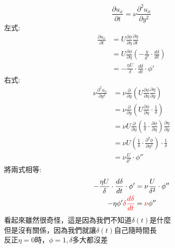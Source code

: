 \documentclass[../main.tex]{subfiles}
\begin{document}
\begin{itemize}
\begin{enumerate}
\begin{itemize}
\begin{enumerate}
        \begin{equation}
          \frac{\partial u_x}{\partial t} = \nu\frac{\partial^2 u_x}{\partial y^2}
        \end{equation}
        左式:
        \begin{align}
          \frac{\partial u_x}{\partial t} &= U\frac{\partial \phi}{\partial \eta}\frac{\partial \eta}{\partial t} \nonumber\\
          &= U\frac{\partial \phi}{\partial \eta}\left(
            -\frac{y}{\delta^2}\cdot \frac{d\delta}{dt}
          \right) \nonumber\\
          &= -\frac{\eta U}{\delta}\cdot \frac{d\delta}{dt}\cdot \phi' \label{eq:ch2_4_unsteady_state_partial_ux_partial_t}
        \end{align}
        右式:
        \begin{align}
          \nu\frac{\partial^2 u_x}{\partial y^2} &= \nu \frac{\partial}{\partial y}\left(
            U\frac{\partial \phi}{\partial \eta}\frac{\partial \eta}{\partial y}
          \right) \nonumber\\
          &= \nu \frac{\partial}{\partial y}\left(
            U\frac{\partial \phi}{\partial \eta}\cdot \frac{1}{\delta}
          \right) \nonumber\\
          &= \nu U \frac{\partial}{\partial \eta}\left(
            \frac{1}{\delta}\cdot \frac{\partial \phi}{\partial \eta}
          \right)\frac{\partial \eta}{\partial y} \nonumber\\
          &= \nu U \left(
            \frac{1}{\delta}\cdot \frac{\partial^2 \phi}{\partial \eta^2}
          \right)\cdot \frac{1}{\delta} \nonumber\\
          &= \nu \frac{U}{\delta^2}\cdot \phi'' \label{eq:ch2_4_unsteady_state_nu_partial2_ux_partial_y2}
        \end{align}
        將兩式相等:
        \begin{align}
          -\frac{\eta U}{\delta}\cdot \frac{d\delta}{dt}\cdot \phi' &= \nu \frac{U}{\delta^2}\cdot \phi'' \nonumber\\
          -\eta \phi' {\color{red}\delta \frac{d\delta}{dt}} &= {\color{red}\nu} \phi'' \label{eq:ch2_4_unsteady_state_phi}
        \end{align}
        看起來雖然很奇怪，這是因為我們不知道$\delta(t)$是什麼\\
        但是沒有關係，因為我們就讓$\delta(t)$自己隨時間長\\
        反正$\eta=0$時，$\phi=1,\delta$多大都沒差\\

\end{enumerate}
\end{itemize}
\end{enumerate}
\end{itemize}
\end{document}
